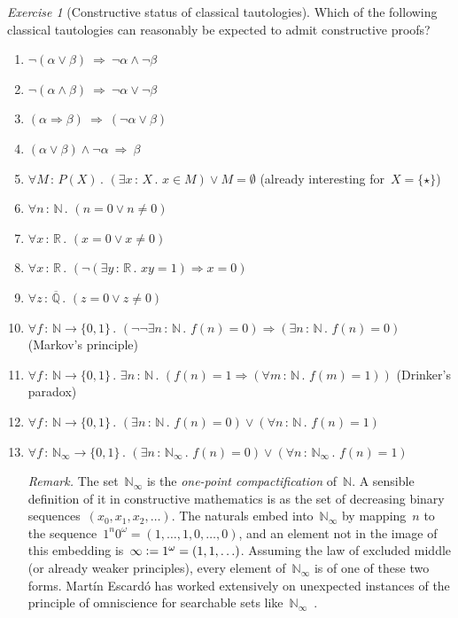 \documentclass[10pt,reqno,a4paper,openany]{amsbook}
\theoremstyle{definition}
\theoremstyle{plain}
\theoremstyle{remark}
\newcommand{\NN}{\mathbb{N}}
\newcommand{\RR}{\mathbb{R}}
\newcommand{\QQ}{\mathbb{Q}}
\newcommand{\?}{\,{:}\,}
\renewcommand{\_}{\mathpunct{.}\,}
\newcommand{\defeq}{\vcentcolon=}
\newtheorem{exercise}[defn]{Exercise}
\begin{document}
\begin{exercise}[Constructive status of classical tautologies]\label{ex:tautologies}
Which of the following classical tautologies can reasonably be expected to
admit constructive proofs?
\begin{enumerate}
\item $\neg(\alpha \vee \beta) \ \Longrightarrow\ \neg\alpha \wedge \neg\beta$
\item $\neg(\alpha \wedge \beta) \ \Longrightarrow\ \neg\alpha \vee \neg\beta$
\item $(\alpha \Rightarrow \beta) \ \Longrightarrow\ (\neg\alpha \vee \beta)$
\item $(\alpha \vee \beta) \wedge \neg\alpha \ \Longrightarrow\ \beta$
\item $\forall M\?P(X)\_ (\exists x\?X\_ x \in M) \vee M = \emptyset$
(already interesting for~$X = \{\star\}$)
\item $\forall n\?\NN\_ (n = 0 \vee n \neq 0)$
\item $\forall x\?\RR\_ (x = 0 \vee x \neq 0)$
\item $\forall x\?\RR\_ (\neg(\exists y\?\RR\_ xy=1) \Rightarrow x = 0)$
\item $\forall z\?\overline{\QQ}\_ (z = 0 \vee z \neq 0)$
\item $\forall f \? \NN \to \{0,1\}\_ (\neg\neg\exists n \? \NN\_ f(n) = 0)
\Rightarrow (\exists n \? \NN\_ f(n) = 0)$ (Markov's principle)
\item $\forall f \? \NN \to \{0,1\}\_ \exists n \? \NN\_ (f(n) = 1
\Rightarrow (\forall m \? \NN\_ f(m) = 1))$ (Drinker's paradox)
\item $\forall f \? \NN \to \{0,1\}\_ (\exists n \? \NN\_ f(n) = 0) \vee
(\forall n \? \NN\_ f(n) = 1)$
\item $\forall f \? \NN_\infty \to \{0,1\}\_ (\exists n \? \NN_\infty\_ f(n) = 0) \vee
(\forall n \? \NN_\infty\_ f(n) = 1)$

{\noindent\scriptsize\emph{Remark.} The set~$\NN_\infty$ is the \emph{one-point
compactification} of~$\NN$. A sensible definition of it in constructive mathematics
is as the set of decreasing binary sequences~$(x_0,x_1,x_2,\ldots)$. The
naturals embed into~$\NN_\infty$ by mapping~$n$ to the sequence~$1^n 0^\omega =
(1,\ldots,1,0,\ldots,0)$, and an element not in the image of this embedding
is~$\infty \defeq 1^\omega = (1,1,\ldots)$. Assuming the law of excluded
middle (or already weaker principles), every element of~$\NN_\infty$ is of one
of these two forms. Martín Escardó has worked extensively on unexpected
instances of the principle of omniscience for searchable sets
like~$\NN_\infty$~\cite{escardo:omniscience1,escardo:omniscience2,escardo:omniscience}.\par}
\end{enumerate}
\end{exercise}
\end{document}
